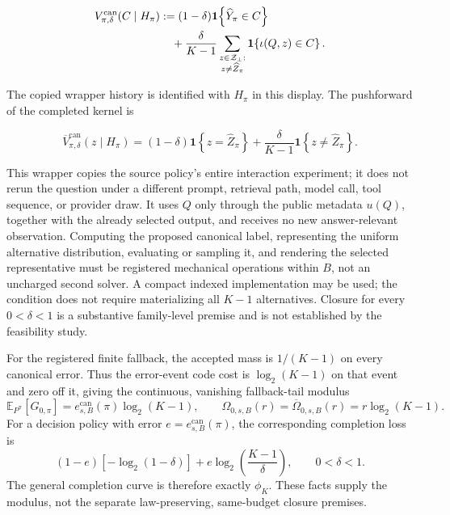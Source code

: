 \documentclass[10pt]{article} %
\providecommand{\1}{\mathbf{1}}  %
\theoremstyle{remark}
\theoremstyle{definition}
\begin{document}
\begin{align}
V_{\pi,\delta}^{\mathrm{can}}(C\mid H_\pi)
&:=
(1-\delta)
\mathbf 1\!\left\{\widehat Y_\pi\in C\right\}
\notag\\
&\quad+
\frac{\delta}{K-1}
\sum_{\substack{z\in\mathcal Z_{\bot}:\\
z\neq\widehat Z_\pi}}
\mathbf 1\!\left\{\iota(Q,z)\in C\right\}.
\label{eq:raw-canonical-confidence-completion}
\end{align}

The copied wrapper history is identified with $H_\pi$ in this display.  The
pushforward of the completed kernel is

\begin{equation}
\overline V_{\pi,\delta}^{\mathrm{can}}(z\mid H_\pi)
=
(1-\delta)
\mathbf 1\!\left\{z=\widehat Z_\pi\right\}
+
\frac{\delta}{K-1}
\mathbf 1\!\left\{z\neq\widehat Z_\pi\right\}.
\label{eq:canonical-confidence-completion}
\end{equation}

This wrapper copies the source policy's entire interaction experiment; it
does not rerun the question under a different prompt, retrieval path, model
call, tool sequence, or provider draw.  It uses $Q$ only through the public
metadata $u(Q)$, together with the already selected output, and receives no
new answer-relevant observation.  Computing the proposed canonical label,
representing the uniform alternative distribution, evaluating or sampling it,
and rendering the selected representative must be registered mechanical
operations within $B$, not an uncharged second solver.  A compact indexed
implementation may be used; the condition does not require materializing all
$K-1$ alternatives.  Closure for every $0<\delta<1$ is a substantive
family-level premise and is not established by the feasibility study.

For the registered finite fallback, the accepted mass is $1/(K-1)$ on
every canonical error. Thus the error-event code cost is
$\log_2(K-1)$ on that event and zero off it, giving the continuous,
vanishing fallback-tail modulus
\begin{equation}
\mathbb E_{P^\pi}[G_{0,\pi}]
=e_{s,B}^{\mathrm{can}}(\pi)\log_2(K-1),
\qquad
\Omega_{0,s,B}(r)=\overline\Omega_{0,s,B}(r)
=r\log_2(K-1).
\end{equation}
For a decision policy with error $e=e_{s,B}^{\mathrm{can}}(\pi)$, the
corresponding completion loss is
\begin{equation}
(1-e)[-\log_2(1-\delta)]
+e\log_2\!\left(\frac{K-1}{\delta}\right),
\qquad 0<\delta<1.
\label{eq:fixed-canonical-completion-loss}
\end{equation}
The general completion curve is therefore exactly $\phi_K$. These facts
supply the modulus, not the separate law-preserving, same-budget closure
premises.
\end{document}
